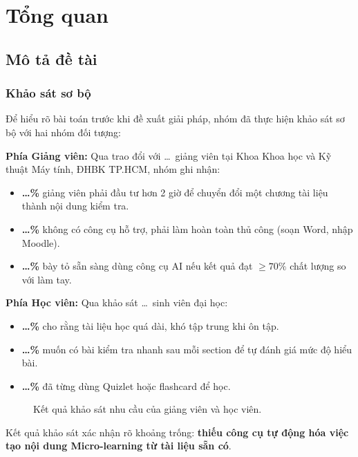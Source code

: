 \section{Tổng quan}

\subsection{Mô tả đề tài}

\subsubsection{Khảo sát sơ bộ}

Để hiểu rõ bài toán trước khi đề xuất giải pháp, nhóm đã thực hiện khảo sát
sơ bộ với hai nhóm đối tượng:

\textbf{Phía Giảng viên:} Qua trao đổi với \ldots\ giảng viên tại Khoa Khoa
học và Kỹ thuật Máy tính, ĐHBK TP.HCM, nhóm ghi nhận:
\begin{itemize}
    \item \textbf{\ldots\%} giảng viên phải đầu tư hơn 2 giờ để chuyển đổi
          một chương tài liệu thành nội dung kiểm tra.
    \item \textbf{\ldots\%} không có công cụ hỗ trợ, phải làm hoàn toàn thủ
          công (soạn Word, nhập Moodle).
    \item \textbf{\ldots\%} bày tỏ sẵn sàng dùng công cụ AI nếu kết quả đạt
          $\geq 70\%$ chất lượng so với làm tay.
\end{itemize}

\textbf{Phía Học viên:} Qua khảo sát \ldots\ sinh viên đại học:
\begin{itemize}
    \item \textbf{\ldots\%} cho rằng tài liệu học quá dài, khó tập trung khi
          ôn tập.
    \item \textbf{\ldots\%} muốn có bài kiểm tra nhanh sau mỗi section để
          tự đánh giá mức độ hiểu bài.
    \item \textbf{\ldots\%} đã từng dùng Quizlet hoặc flashcard để học.
\end{itemize}

\begin{figure}[H]
    \centering
    \caption{Kết quả khảo sát nhu cầu của giảng viên và học viên.}
    \label{fig:survey}
\end{figure}

Kết quả khảo sát xác nhận rõ khoảng trống: \textbf{thiếu công cụ tự động hóa
việc tạo nội dung Micro-learning từ tài liệu sẵn có}.

